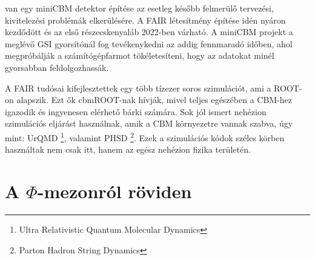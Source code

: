 \documentclass[a4paper,12pt]{article}
\begin{document}
van egy miniCBM detektor építése az esetleg később felmerülő tervezési, kivitelezési problémák elkerülésére. A FAIR létesítmény építése idén 
nyáron kezdődött és az első részecskenyaláb 2022-ben várható. A miniCBM projekt a meglévő GSI gyorsítónál fog tevékenykedni az addig fennmaradó
időben, ahol megpróbálják a számítógépfarmot tökéletesíteni, hogy az adatokat minél gyorsabban feldolgozhassák.
\vspace{5mm}
\par A FAIR tudósai kifejlesztettek egy több tízezer soros szimulációt, ami a ROOT-on alapszik. Ezt ők cbmROOT-nak hívják, mivel teljes
egészében a CBM-hez igazodik és ingyenesen elérhető bárki számára. Sok jól ismert nehézion szimulációs eljárást használnak, amik a CBM
környezetre vannak szabva, úgy mint: UrQMD \footnote{ Ultra Relativistic Quantum Molecular Dynamics }, valamint  PHSD \footnote{ Parton Hadron String Dynamics }.
 Ezek a szimulációs kódok széles körben használtak nem csak itt, hanem az egész nehézion fizika területén. 
\section{ A $\Phi$-mezonról röviden}
\end{document}
